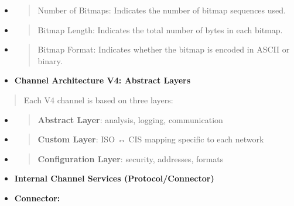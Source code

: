 \documentclass[12pt,a4paper]{report}
\begin{document}
\begin{itemize}
\item
  \begin{quote}
  Number of Bitmaps: Indicates the number of bitmap sequences used.
  \end{quote}
\item
  \begin{quote}
  Bitmap Length: Indicates the total number of bytes in each bitmap.
  \end{quote}
\item
  \begin{quote}
  Bitmap Format: Indicates whether the bitmap is encoded in ASCII or
  binary.
  \end{quote}
\end{itemize}

\begin{itemize}
\item
  \textbf{Channel Architecture V4: Abstract Layers}
\end{itemize}

\begin{quote}
Each V4 channel is based on three layers:
\end{quote}

\begin{itemize}
\item
  \begin{quote}
  \textbf{Abstract Layer}: analysis, logging, communication
  \end{quote}
\item
  \begin{quote}
  \textbf{Custom Layer}: ISO ↔ CIS mapping specific to each network
  \end{quote}
\item
  \begin{quote}
  \textbf{Configuration Layer}: security, addresses, formats
  \end{quote}
\end{itemize}

\begin{itemize}
\item
  \textbf{Internal Channel Services (Protocol/Connector)}
\end{itemize}

\begin{itemize}
\item
  \textbf{Connector:}
\end{itemize}
\end{document}
